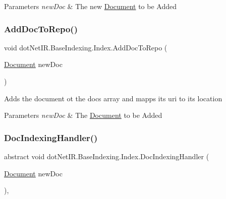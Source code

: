 \begin{DoxyParams}{Parameters}
{\em new\+Doc} & The new \hyperlink{classdot_net_i_r_1_1_base_indexing_1_1_document}{Document} to be Added\\
\hline
\end{DoxyParams}
\hypertarget{classdot_net_i_r_1_1_base_indexing_1_1_index_a519531283425656fe695295b6ec8ca92}{}\label{classdot_net_i_r_1_1_base_indexing_1_1_index_a519531283425656fe695295b6ec8ca92} 
\subsubsection{\texorpdfstring{Add\+Doc\+To\+Repo()}{AddDocToRepo()}}
{\footnotesize\ttfamily void dot\+Net\+I\+R.\+Base\+Indexing.\+Index.\+Add\+Doc\+To\+Repo (\begin{DoxyParamCaption}\item[{\hyperlink{classdot_net_i_r_1_1_base_indexing_1_1_document}{Document}}]{new\+Doc }\end{DoxyParamCaption})\hspace{0.3cm}{\ttfamily [protected]}}



Adds the document ot the docs array and mapps its uri to its location 


\begin{DoxyParams}{Parameters}
{\em new\+Doc} & The \hyperlink{classdot_net_i_r_1_1_base_indexing_1_1_document}{Document} to be Added\\
\hline
\end{DoxyParams}
\hypertarget{classdot_net_i_r_1_1_base_indexing_1_1_index_a0542ffc547b7cc72f4615c763589ba3c}{}\label{classdot_net_i_r_1_1_base_indexing_1_1_index_a0542ffc547b7cc72f4615c763589ba3c} 
\subsubsection{\texorpdfstring{Doc\+Indexing\+Handler()}{DocIndexingHandler()}}
{\footnotesize\ttfamily abstract void dot\+Net\+I\+R.\+Base\+Indexing.\+Index.\+Doc\+Indexing\+Handler (\begin{DoxyParamCaption}\item[{\hyperlink{classdot_net_i_r_1_1_base_indexing_1_1_document}{Document}}]{new\+Doc }\end{DoxyParamCaption})\hspace{0.3cm}{\ttfamily [protected]}, {}}



